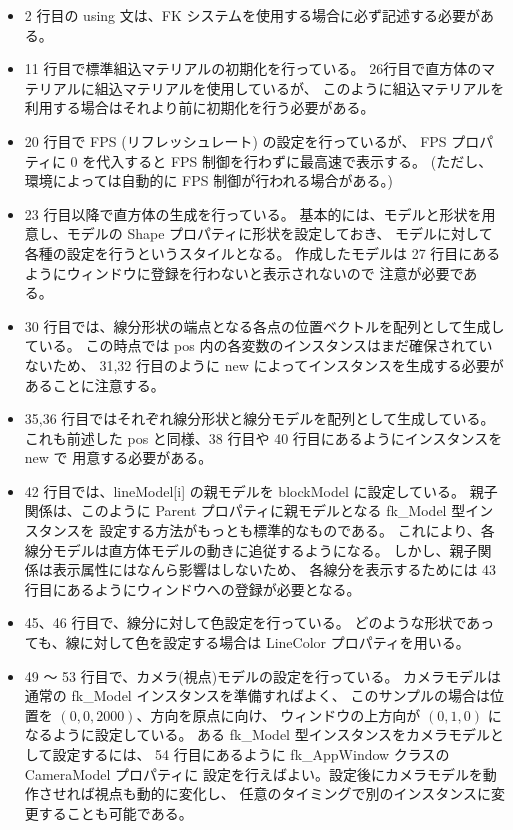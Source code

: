 \begin{itemize}

\item 2 行目の using 文は、FK システムを使用する場合に必ず記述する必要がある。

\item 11 行目で標準組込マテリアルの初期化を行っている。
      26行目で直方体のマテリアルに組込マテリアルを使用しているが、
      このように組込マテリアルを利用する場合はそれより前に初期化を行う必要がある。

\item 20 行目で FPS (リフレッシュレート) の設定を行っているが、
	FPS プロパティに 0 を代入すると FPS 制御を行わずに最高速で表示する。
	(ただし、環境によっては自動的に FPS 制御が行われる場合がある。)

\item 23 行目以降で直方体の生成を行っている。
      基本的には、モデルと形状を用意し、モデルの Shape プロパティに形状を設定しておき、
      モデルに対して各種の設定を行うというスタイルとなる。
      作成したモデルは 27 行目にあるようにウィンドウに登録を行わないと表示されないので
      注意が必要である。

\item 30 行目では、線分形状の端点となる各点の位置ベクトルを配列として生成している。
	この時点では pos 内の各変数のインスタンスはまだ確保されていないため、
	31,32 行目のように new によってインスタンスを生成する必要があることに注意する。

\item 35,36 行目ではそれぞれ線分形状と線分モデルを配列として生成している。
	これも前述した pos と同様、38 行目や 40 行目にあるようにインスタンスを new で
	用意する必要がある。

\item 42 行目では、lineModel[i] の親モデルを blockModel に設定している。
	親子関係は、このように Parent プロパティに親モデルとなる fk\_Model 型インスタンスを
	設定する方法がもっとも標準的なものである。
	これにより、各線分モデルは直方体モデルの動きに追従するようになる。
	しかし、親子関係は表示属性にはなんら影響はしないため、
	各線分を表示するためには 43 行目にあるようにウィンドウへの登録が必要となる。
	
\item 45、46 行目で、線分に対して色設定を行っている。
	どのような形状であっても、線に対して色を設定する場合は
	LineColor プロパティを用いる。

\item 49 〜 53 行目で、カメラ(視点)モデルの設定を行っている。
	カメラモデルは通常の fk\_Model インスタンスを準備すればよく、
	このサンプルの場合は位置を \((0,0, 2000)\)、方向を原点に向け、
	ウィンドウの上方向が \((0, 1, 0)\) になるように設定している。
	ある fk\_Model 型インスタンスをカメラモデルとして設定するには、
	54 行目にあるように fk\_AppWindow クラスの CameraModel プロパティに
	設定を行えばよい。設定後にカメラモデルを動作させれば視点も動的に変化し、
	任意のタイミングで別のインスタンスに変更することも可能である。
	

\end{itemize}
